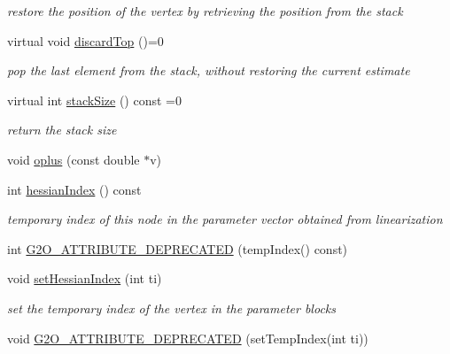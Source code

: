 \begin{DoxyCompactItemize}
\begin{DoxyCompactList}\small\item\em restore the position of the vertex by retrieving the position from the stack \end{DoxyCompactList}\item 
virtual void \mbox{\hyperlink{classg2o_1_1_optimizable_graph_1_1_vertex_a9509fb5c333988911312fc3d9187a9c3}{discard\+Top}} ()=0
\begin{DoxyCompactList}\small\item\em pop the last element from the stack, without restoring the current estimate \end{DoxyCompactList}\item 
virtual int \mbox{\hyperlink{classg2o_1_1_optimizable_graph_1_1_vertex_a0a4ecc894d008d9c3806a3660e7dfe6f}{stack\+Size}} () const =0
\begin{DoxyCompactList}\small\item\em return the stack size \end{DoxyCompactList}\item 
void \mbox{\hyperlink{classg2o_1_1_optimizable_graph_1_1_vertex_af4357b634cfd884cd2fa1abb05832ec8}{oplus}} (const double $\ast$v)
\item 
int \mbox{\hyperlink{classg2o_1_1_optimizable_graph_1_1_vertex_a05a371cfa6314d0f2d209289b01cc922}{hessian\+Index}} () const
\begin{DoxyCompactList}\small\item\em temporary index of this node in the parameter vector obtained from linearization \end{DoxyCompactList}\item 
int \mbox{\hyperlink{classg2o_1_1_optimizable_graph_1_1_vertex_a8f22181a161d724e95631d5da742b66a}{G2\+O\+\_\+\+A\+T\+T\+R\+I\+B\+U\+T\+E\+\_\+\+D\+E\+P\+R\+E\+C\+A\+T\+ED}} (temp\+Index() const)
\item 
void \mbox{\hyperlink{classg2o_1_1_optimizable_graph_1_1_vertex_a440f24c0108be5247f3529369aa1e53c}{set\+Hessian\+Index}} (int ti)
\begin{DoxyCompactList}\small\item\em set the temporary index of the vertex in the parameter blocks \end{DoxyCompactList}\item 
void \mbox{\hyperlink{classg2o_1_1_optimizable_graph_1_1_vertex_abdcd545b6870b37135b055d18dae7a36}{G2\+O\+\_\+\+A\+T\+T\+R\+I\+B\+U\+T\+E\+\_\+\+D\+E\+P\+R\+E\+C\+A\+T\+ED}} (set\+Temp\+Index(int ti))
\item 

\end{DoxyCompactItemize}
